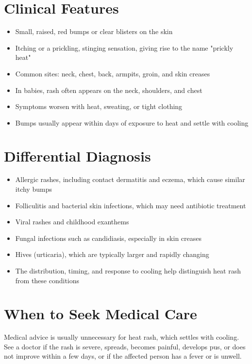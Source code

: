 \section*{Clinical Features}
\begin{itemize}
    \item Small, raised, red bumps or clear blisters on the skin
    \item Itching or a prickling, stinging sensation, giving rise to the name "prickly heat"
    \item Common sites: neck, chest, back, armpits, groin, and skin creases
    \item In babies, rash often appears on the neck, shoulders, and chest
    \item Symptoms worsen with heat, sweating, or tight clothing
    \item Bumps usually appear within days of exposure to heat and settle with cooling
\end{itemize}

\section*{Differential Diagnosis}
\begin{itemize}
    \item Allergic rashes, including contact dermatitis and eczema, which cause similar itchy bumps
    \item Folliculitis and bacterial skin infections, which may need antibiotic treatment
    \item Viral rashes and childhood exanthems
    \item Fungal infections such as candidiasis, especially in skin creases
    \item Hives (urticaria), which are typically larger and rapidly changing
    \item The distribution, timing, and response to cooling help distinguish heat rash from these conditions
\end{itemize}

\section*{When to Seek Medical Care}
Medical advice is usually unnecessary for heat rash, which settles with cooling. See a doctor if the rash is severe, spreads, becomes painful, develops pus, or does not improve within a few days, or if the affected person has a fever or is unwell.

